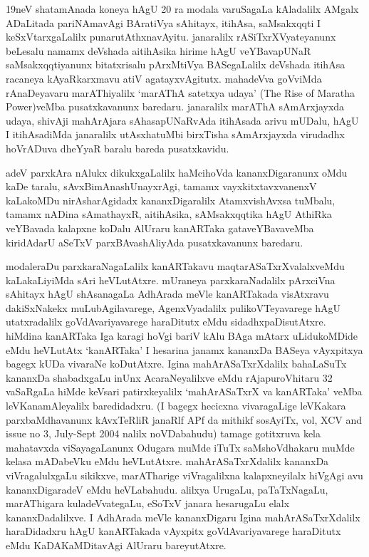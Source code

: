 \documentclass[11pt,a4size]{article}
\begin{document}
19neV shatamAnada koneya hAgU 20 ra modala varuSagaLa kAladalilx
AMgalx ADaLitada pariNAmavAgi BAratiVya sAhitayx, itihAsa, saMsakxqqti
I keSxVtarxgaLalilx punarutAthxnavAyitu. janaralilx
rASiTxrXVyateyanunx beLesalu namamx deVshada aitihAsika hirime hAgU
veYBavapUNaR saMsakxqqtiyanunx bitatxrisalu pArxMtiVya BASegaLalilx
deVshada itihAsa racaneya kAyaRkarxmavu atiV
agatayxvAgitutx. mahadeVva goVviMda rAnaDeyavaru marAThiyalilx
`marAThA satetxya udaya' {\footnotesize{\rm (The Rise of Maratha
    Power)}}veMba pusatxkavanunx baredaru. janaralilx marAThA
sAmArxjayxda udaya, shivAji mahArAjara sAhasapUNaRvAda itihAsada arivu
mUDalu, hAgU I itihAsadiMda janaralilx utAsxhatuMbi birxTisha
sAmArxjayxda virudadhx hoVrADuva dheYyaR baralu bareda pusatxkavidu.

adeV parxkAra nAlukx dikukxgaLalilx haMcihoVda kananxDigaranunx oMdu
kaDe taralu, sAvxBimAnashUnayxrAgi, tamamx vayxkitxtavxvanenxV
kaLakoMDu nirAsharAgidadx kananxDigaralilx AtamxvishAvxsa tuMbalu,
tamamx nADina sAmathayxR, aitihAsika, sAMsakxqqtika hAgU AthiRka
veYBavada kalapxne koDalu AlUraru kanARTaka gataveYBavaveMba
kiridAdarU aSeTxV parxBAvashAliyAda pusatxkavanunx baredaru.

modaleraDu parxkaraNagaLalilx kanARTakavu maqtarASaTxrXvalalxveMdu
kaLakaLiyiMda sAri heVLutAtxre. mUraneya parxkaraNadalilx pArxciVna
sAhitayx hAgU shAsanagaLa AdhArada meVle kanARTakada visAtxravu
dakiSxNakekx muLubAgilavarege, AgenxVyadalilx pulikoVTeyavarege hAgU
utatxradalilx goVdAvariyavarege haraDitutx eMdu
sidadhxpaDisutAtxre. hiMdina kanARTaka Iga karagi hoVgi bariV kAlu
BAga mAtarx uLidukoMDide eMdu heVLutAtx `kanARTaka' I hesarina janamx kananxDa
BASeya vAyxpitxya bagegx kUDa vivaraNe koDutAtxre. Igina
mahArASaTxrXdalilx bahaLaSuTx kananxDa shabadxgaLu inUnx
AcaraNeyalilxve eMdu rAjapuroVhitaru 32 vaSaRgaLa hiMde keVsari
patirxkeyalilx `mahArASaTxrX va kanARTaka' veMba leVKanamAleyalilx
baredidadxru. (I bagegx hecicxna vivaragaLige leVKakara
parxbaMdhavanunx kAvxTeRliR janaRlf APf da mithikf sosAyiTx,
{\footnotesize{\rm vol, XCV and issue no 3, July-Sept 2004}} nalilx
noVDabahudu) tamage gotitxruva kela mahatavxda viSayagaLanunx Odugara
muMde iTuTx saMshoVdhakaru muMde kelasa mADabeVku eMdu
heVLutAtxre. mahArASaTxrXdalilx kananxDa viVragalulxgaLu sikikxve,
marATharige viVragalilxna kalapxneyilalx hiVgAgi avu kananxDigaradeV
eMdu heVLabahudu. alilxya UrugaLu, paTaTxNagaLu, marAThigara
kuladeVvategaLu, eSoTxV janara hesarugaLu elalx kananxDadalilxve. I
AdhArada meVle kananxDigaru Igina mahArASaTxrXdalilx haraDidadxru hAgU
kanARTakada vAyxpitx goVdAvariyavarege haraDitutx eMdu KaDAKaMDitavAgi
AlUraru bareyutAtxre.
\end{document}
